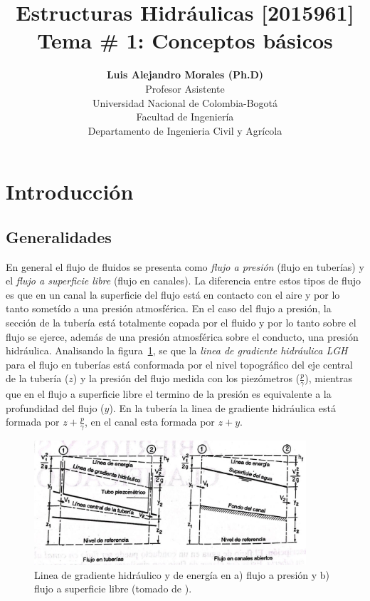 \documentclass[11pt, oneside]{article}
\title{Estructuras Hidr\'aulicas [2015961] \\ \textbf{Tema \# 1: Conceptos b\'asicos}}
\author{\textbf{Luis Alejandro Morales (Ph.D)}\\ \vspace{0.4cm} Profesor Asistente \\ Universidad Nacional de Colombia-Bogot\'a\\Facultad de Ingenier\'ia \\ Departamento de Ingenieria Civil y Agr\'icola}
\date{}
\begin{document}
\maketitle
\tableofcontents


\section{Introducci\'on} %
\subsection{Generalidades}
En general el flujo de fluidos se presenta como \emph{flujo a presi\'on} (flujo en tuber\'ias) y el \emph{flujo a superficie libre} (flujo en canales). La diferencia entre estos tipos de flujo es que en un canal la superficie del flujo est\'a en contacto con el aire y por lo tanto somet\'ido a una presi\'on atmosf\'erica. En el caso del flujo a presi\'on, la secci\'on de la tuber\'ia est\'a totalmente copada por el fluido y por lo tanto sobre el flujo se ejerce, adem\'as de una presi\'on atmosf\'erica sobre el conducto, una presi\'on hidr\'aulica. Analisando la figura~\ref{fig1}, se que la \emph{linea de gradiente hidr\'aulica {LGH}} para el flujo en tuber\'ias est\'a conformada por el nivel topogr\'afico del eje central de la tuber\'ia ($z$) y la presi\'on del flujo medida con los piez\'ometros ($\frac{p}{\gamma}$), mientras que en el flujo a superficie libre el termino de la presi\'on es equivalente a la profundidad del flujo ($y$). En la tuber\'ia la linea de gradiente hidr\'aulica est\'a formada por $z + \frac{p}{\gamma}$, en el canal esta formada por $z+y$. 
\begin{figure}[h]
\centering
\includegraphics[width=0.9\textwidth]{fig1.jpeg}
\caption{Linea de gradiente hidr\'aulico y de energ\'ia en a) flujo a presi\'on y b) flujo a superficie libre (tomado de \cite{VChow}).}
\label{fig1}
\end{figure}
\end{document}
